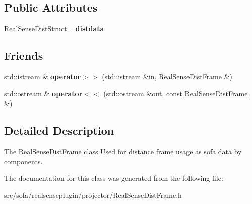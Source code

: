 \subsection*{Public Attributes}
\begin{DoxyCompactItemize}
\item 
\mbox{\label{classsofa_1_1rgbdtracking_1_1_real_sense_dist_frame_a95575d91b20d0cdc8cb9a9ba3795f928}} 
\hyperlink{structsofa_1_1rgbdtracking_1_1_real_sense_dist_frame_1_1_real_sense_dist_struct}{Real\+Sense\+Dist\+Struct} {\bfseries \+\_\+distdata}
\end{DoxyCompactItemize}
\subsection*{Friends}
\begin{DoxyCompactItemize}
\item 
\mbox{\label{classsofa_1_1rgbdtracking_1_1_real_sense_dist_frame_ac7776007f9ac565bc64143b9c2e29c7d}} 
std\+::istream \& {\bfseries operator$>$$>$} (std\+::istream \&in, \hyperlink{classsofa_1_1rgbdtracking_1_1_real_sense_dist_frame}{Real\+Sense\+Dist\+Frame} \&)
\item 
\mbox{\label{classsofa_1_1rgbdtracking_1_1_real_sense_dist_frame_ad9831ad196082e583b86e863ec7d3460}} 
std\+::ostream \& {\bfseries operator$<$$<$} (std\+::ostream \&out, const \hyperlink{classsofa_1_1rgbdtracking_1_1_real_sense_dist_frame}{Real\+Sense\+Dist\+Frame} \&)
\end{DoxyCompactItemize}


\subsection{Detailed Description}
The \hyperlink{classsofa_1_1rgbdtracking_1_1_real_sense_dist_frame}{Real\+Sense\+Dist\+Frame} class Used for distance frame usage as sofa data by components. 

The documentation for this class was generated from the following file\+:\begin{DoxyCompactItemize}
\item 
src/sofa/realsenseplugin/projector/Real\+Sense\+Dist\+Frame.\+h\end{DoxyCompactItemize}
